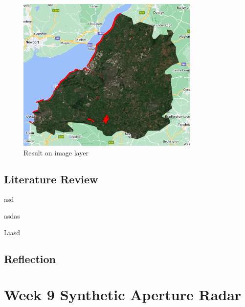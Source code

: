 \documentclass[
  letterpaper,
  DIV=11,
  numbers=noendperiod]{scrreprt}
\begin{document}
\begin{figure}

{\centering \includegraphics[width=3.54167in,height=3.02083in]{images/wk8/result2_bristol_water.png}

}

\caption{Result on image layer}

\end{figure}

\hypertarget{literature-review}{%
\section*{Literature Review}\label{literature-review}}


asd

asdas

Liasd

\hypertarget{reflection-4}{%
\section*{Reflection}\label{reflection-4}}


\hypertarget{week-9-synthetic-aperture-radar}{%
\chapter*{Week 9 Synthetic Aperture
Radar}\label{week-9-synthetic-aperture-radar}}

\end{document}

